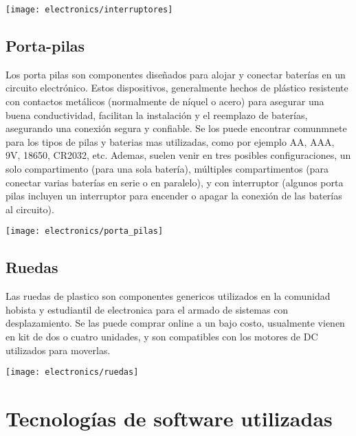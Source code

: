 \begin{center}
    \centering
    \texttt{[image: electronics/interruptores]}
    \label{fig:interruptores}
\end{center}

\subsection{Porta-pilas}

Los porta pilas son componentes diseñados para alojar y conectar baterías en un circuito electrónico. Estos dispositivos, generalmente hechos de plástico resistente con contactos metálicos (normalmente de níquel o acero) para asegurar una buena conductividad, facilitan la instalación y el reemplazo de baterías, asegurando una conexión segura y confiable. Se los puede encontrar comunmnete para los tipos de pilas y baterias mas utilizadas, como por ejemplo AA, AAA, 9V, 18650, CR2032, etc. Ademas, suelen venir en tres posibles configuraciones, un solo compartimento (para una sola batería), múltiples compartimentos (para conectar varias baterías en serie o en paralelo), y con interruptor (algunos porta pilas incluyen un interruptor para encender o apagar la conexión de las baterías al circuito).

\begin{center}
    \centering
    \texttt{[image: electronics/porta\_pilas]}
    \label{fig:porta_pilas}
\end{center}

\subsection{Ruedas}

Las ruedas de plastico son componentes genericos utilizados en la comunidad hobista y estudiantil de electronica para el armado de sistemas con desplazamiento. Se las puede comprar online a un bajo costo, usualmente vienen en kit de dos o cuatro unidades, y son compatibles con los motores de DC utilizados para moverlas.

\begin{center}
    \centering
    \texttt{[image: electronics/ruedas]}
    \label{fig:ruedas}
\end{center}

\section{Tecnologías de software utilizadas} 

